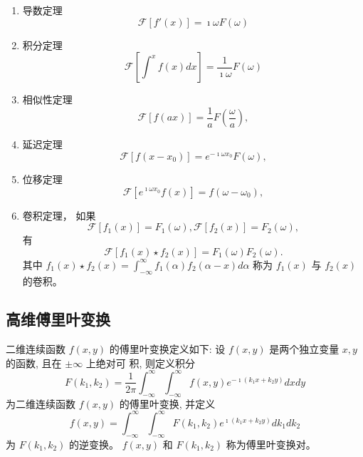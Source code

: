 \begin{enumerate}
    \item 导数定理
    \begin{equation}
        \mathcal{F} [f'(x)] = \imath \omega F(\omega)
    \end{equation}

    \item 积分定理
    \begin{equation}
        \mathcal{F} [ \int^{x} f(x) dx ] = \frac{1}{\imath \omega} F(\omega)
    \end{equation}

    \item 相似性定理
    \begin{equation}
        \mathcal{F} [ f(ax) ] = \frac{1}{a} F(\frac{\omega}{a}),
    \end{equation}
    \item 延迟定理
    \begin{equation}
        \mathcal{F} [ f(x - x_0 ) ] = e^{-\imath \omega x_0} F(\omega),
    \end{equation}
    \item 位移定理
    \begin{equation}
        \mathcal{F} [ e^{\imath \omega x_0} f(x) ] = f(\omega - \omega_0),
    \end{equation}
    \item 卷积定理， 如果
    \[
        \mathcal{F} [f_1(x)] =  F_1(\omega), \mathcal{F} [f_2(x)] =  F_2(\omega), 
    \]
    有
    \begin{equation}
        \mathcal{F} [f_1(x)\star f_2(x) ] = F_1(\omega) F_2(\omega).
    \end{equation}
    其中 $f_1(x) \star f_2(x)=\int_{-\infty}^{\infty} f_1(\alpha) f_2(\alpha-x) d \alpha$ 称为 $f_1(x)$ 与 $f_2(x)$ 的卷积。
\end{enumerate}

\subsection{高维傅里叶变换}

二维连续函数 $f(x, y)$ 的傅里叶变换定义如下:
设 $f(x, y)$ 是两个独立变量 $x, y$ 的函数, 且在 $\pm \infty$ 上绝对可 积, 则定义积分
$$
F\left(k_1, k_2\right)=\frac{1}{2 \pi} \int_{-\infty}^{\infty} \int_{-\infty}^{\infty} f(x, y) e^{-\imath\left(k_1 x+k_2 y\right)} d x d y
$$
为二维连续函数 $f(x, y)$ 的傅里叶变换, 并定义
$$
f(x, y)=\int_{-\infty}^{\infty} \int_{-\infty}^{\infty} F\left(k_1, k_2\right) e^{\imath\left(k_1 x+k_2 y\right)} d k_1 d k_2
$$
为 $F\left(k_1, k_2\right)$ 的逆变换。
$f(x, y)$ 和 $F\left(k_1, k_2\right)$ 称为傅里叶变换对。

